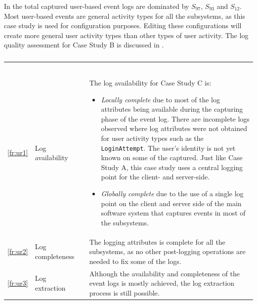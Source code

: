 In  the total captured user-based event logs are dominated by $S_{97}$, $S_{93}$ and $S_{12}$. Most user-based events are general activity types for all the subsystems, as this case study is used for configuration purposes. Editing these configurations will create more general user activity types than other types of user activity. The log quality assessment for Case Study B is discussed in .

\begin{xltabular}{\textwidth}{clcX}
	\caption[Logging quality assessment of Case Study C]{\textit{Logging quality assessment of Case Study C}}\label{tbl:ch3_caseCQuality}\\
	\toprule
	 &  &  &  \\
	\midrule
	\endfirsthead

	\caption[]{\continueCaption} \\
	\toprule
	 &  &  &  \\
	\midrule
	\endhead

	\midrule
	 \\ 
	\endfoot
	\endlastfoot

	\ref{fr:ur1} & Log availability & \cmark & \RaggedRight The log availability for Case Study C is: \begin{itemize}
			\item \textit{Locally complete} due to most of the log attributes being available during the capturing phase of the event log. There are incomplete logs observed where log attributes were not obtained for user activity types such as the \texttt{LoginAttempt}. The user's identity is not yet known on some of the captured. Just like Case Study A, this case study uses a central logging point for the client- and server-side.
			\item \textit{Globally complete} due to the use of a single log point on the client and server side of the main software system that captures events in most of the subsystems. 
		\end{itemize} \\
	\ref{fr:ur2} & Log completeness & \cmark & The logging attributes is complete for all the subsystems, as no other post-logging operations are needed to fix some of the logs. \\
	\ref{fr:ur3} & Log extraction & \cmark & Although the availability and completeness of the event logs is mostly achieved, the log extraction process is still possible. \\
	\bottomrule
\end{xltabular}


